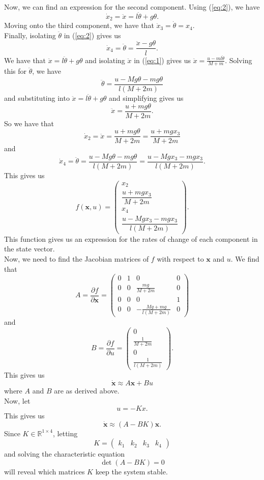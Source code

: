 \documentclass[12pt]{article}
\newcommand{\dx}{\dot{x}}
\newcommand{\bx}{\textbf{x}}
\newcommand{\dbx}{\dot{\bx}}
\newcommand{\ddx}{\ddot{x}}
\newcommand{\ddth}{\ddot{\theta}}
\begin{document}
Now, we can find an expression for the second component. Using (\ref{eq:2}), we have
$$\dx_2 = \ddx = l\ddth + g\theta.$$
Moving onto the third component, we have that $\dx_3 = \dot{\theta} = x_4$. \\
Finally, isolating $\ddth$ in (\ref{eq:2}) gives us
$$\dx_4 = \ddth = \frac{\ddx - g\theta}{l}.$$
We have that $\ddx = l\ddth + g\theta$ and isolating $\ddx$ in (\ref{eq:1}) gives us $\ddx = \frac{u - ml\ddth}{M + m}$. Solving this for $\ddth$, we have
$$\ddth = \frac{u - Mg\theta - mg\theta}{l(M + 2m)}$$
and substituting into $\ddx = l\ddth + g\theta$ and simplifying gives us
$$\ddx = \frac{u + mg\theta}{M + 2m}.$$
So we have that
$$\dx_2 = \ddx = \frac{u + mg\theta}{M + 2m} = \frac{u + mgx_3}{M + 2m}$$
and
$$\dx_4 = \ddth = \frac{u - Mg\theta - mg\theta}{l(M + 2m)} = \frac{u - Mgx_3 - mgx_3}{l(M + 2m)}.$$
This gives us $$f(\bx, u) = \begin{pmatrix} x_2 \\ \dfrac{u + mgx_3}{M + 2m} \\ x_4 \\ \dfrac{u - Mgx_3 - mgx_3}{l(M + 2m)} \end{pmatrix}.$$
This function gives us an expression for the rates of change of each component in the state vector. \\

Now, we need to find the Jacobian matrices of $f$ with respect to $\bx$ and $u$. We find that
$$A = \frac{\partial f}{\partial \bx} = 
\begin{pmatrix}
0 & 1 & 0 & 0 \\
0 & 0 & \frac{mg}{M + 2m} & 0 \\
0 & 0 & 0 & 1 \\
0 & 0 & -\frac{Mg + mg}{l(M + 2m)} & 0
\end{pmatrix}$$
and $$B = \frac{\partial f}{\partial u} =
\begin{pmatrix}
0 \\
\frac{1}{M + 2m} \\
0 \\
\frac{1}{l(M + 2m)}
\end{pmatrix}.$$
This gives us
$$\dbx \approx A\bx + Bu$$
where $A$ and $B$ are as derived above. \\

Now, let
$$u = -Kx.$$
This gives us
$$\dbx \approx (A - BK)\bx.$$
Since $K \in \mathbb{R}^{1 \times 4}$, letting
$$K =
\begin{pmatrix}
k_1 & k_2 & k_3 & k_4
\end{pmatrix}$$
and solving the characteristic equation $$\det(A - BK) = 0$$ will reveal which matrices $K$ keep the system stable. \\
\end{document}
